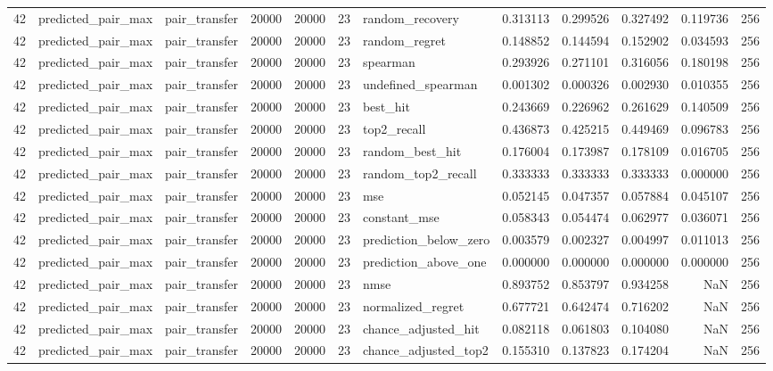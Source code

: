 \begin{tabular}{rllrrrlrrrrr}
42 & predicted_pair_max & pair_transfer & 20000 & 20000 & 23 & random_recovery & 0.313113 & 0.299526 & 0.327492 & 0.119736 & 256 \\
42 & predicted_pair_max & pair_transfer & 20000 & 20000 & 23 & random_regret & 0.148852 & 0.144594 & 0.152902 & 0.034593 & 256 \\
42 & predicted_pair_max & pair_transfer & 20000 & 20000 & 23 & spearman & 0.293926 & 0.271101 & 0.316056 & 0.180198 & 256 \\
42 & predicted_pair_max & pair_transfer & 20000 & 20000 & 23 & undefined_spearman & 0.001302 & 0.000326 & 0.002930 & 0.010355 & 256 \\
42 & predicted_pair_max & pair_transfer & 20000 & 20000 & 23 & best_hit & 0.243669 & 0.226962 & 0.261629 & 0.140509 & 256 \\
42 & predicted_pair_max & pair_transfer & 20000 & 20000 & 23 & top2_recall & 0.436873 & 0.425215 & 0.449469 & 0.096783 & 256 \\
42 & predicted_pair_max & pair_transfer & 20000 & 20000 & 23 & random_best_hit & 0.176004 & 0.173987 & 0.178109 & 0.016705 & 256 \\
42 & predicted_pair_max & pair_transfer & 20000 & 20000 & 23 & random_top2_recall & 0.333333 & 0.333333 & 0.333333 & 0.000000 & 256 \\
42 & predicted_pair_max & pair_transfer & 20000 & 20000 & 23 & mse & 0.052145 & 0.047357 & 0.057884 & 0.045107 & 256 \\
42 & predicted_pair_max & pair_transfer & 20000 & 20000 & 23 & constant_mse & 0.058343 & 0.054474 & 0.062977 & 0.036071 & 256 \\
42 & predicted_pair_max & pair_transfer & 20000 & 20000 & 23 & prediction_below_zero & 0.003579 & 0.002327 & 0.004997 & 0.011013 & 256 \\
42 & predicted_pair_max & pair_transfer & 20000 & 20000 & 23 & prediction_above_one & 0.000000 & 0.000000 & 0.000000 & 0.000000 & 256 \\
42 & predicted_pair_max & pair_transfer & 20000 & 20000 & 23 & nmse & 0.893752 & 0.853797 & 0.934258 & NaN & 256 \\
42 & predicted_pair_max & pair_transfer & 20000 & 20000 & 23 & normalized_regret & 0.677721 & 0.642474 & 0.716202 & NaN & 256 \\
42 & predicted_pair_max & pair_transfer & 20000 & 20000 & 23 & chance_adjusted_hit & 0.082118 & 0.061803 & 0.104080 & NaN & 256 \\
42 & predicted_pair_max & pair_transfer & 20000 & 20000 & 23 & chance_adjusted_top2 & 0.155310 & 0.137823 & 0.174204 & NaN & 256 \\

\end{tabular}
